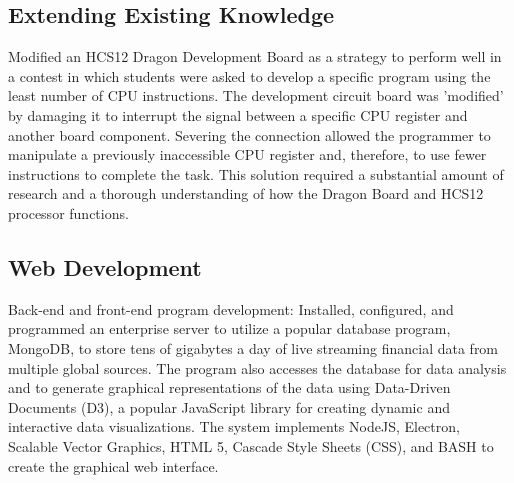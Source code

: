 \begin{describe}
\subsection*{Extending Existing Knowledge}
Modified an HCS12 Dragon Development Board as a strategy to perform well in a contest in which students were asked to develop a specific program using the least number of CPU instructions. The development circuit board was 'modified' by damaging it to interrupt the signal between a specific CPU register and another board component. Severing the connection allowed the programmer to manipulate a previously inaccessible CPU register and, therefore, to use fewer instructions to complete the task. This solution required a substantial amount of research and a thorough understanding of how the Dragon Board and HCS12 processor functions.

\subsection*{Web Development}
Back-end and front-end program development:
Installed, configured, and programmed an enterprise server to utilize a popular database program, MongoDB, to store tens of gigabytes a day of live streaming financial data from multiple global sources. The program also accesses the database for data analysis and to generate graphical representations of the data using Data-Driven Documents (D3), a popular JavaScript library for creating dynamic and interactive data visualizations. The system implements NodeJS, Electron, Scalable Vector Graphics, HTML 5, Cascade Style Sheets (CSS), and BASH to create the graphical web interface. 



\end{describe}
